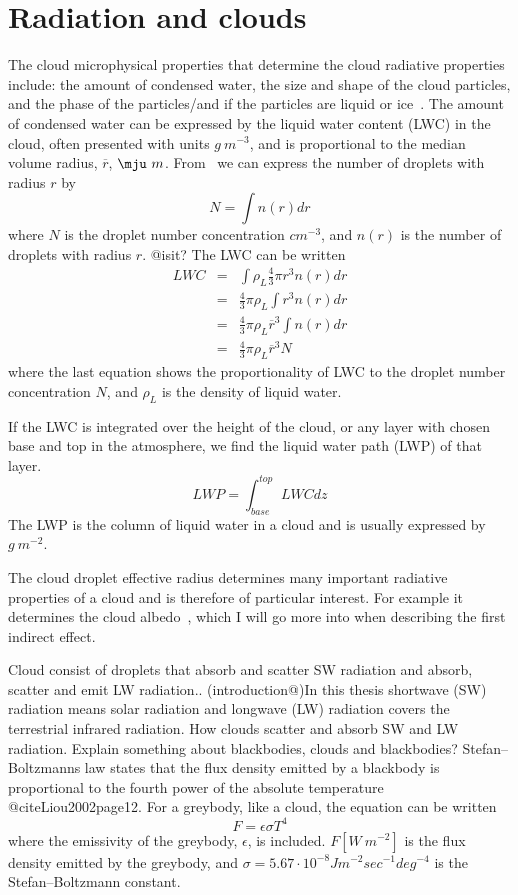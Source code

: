 \section{Radiation and clouds}
The cloud microphysical properties that determine the cloud radiative properties include: the amount of condensed water, the size and shape of the cloud particles, and the phase of the particles/and if the particles are liquid or ice~\citep{Curry1996}. The amount of condensed water can be expressed by the liquid water content (LWC) in the cloud, often presented with units $g~m^{-3}$, and is proportional to the median volume radius, $\overline{r}$, $\mju~m$. From~\cite{Rogers1989} we can express the number of droplets with radius $r$ by
\begin{equation}
N = \int n(r) dr
\end{equation}
where $N$ is the droplet number concentration $cm^{-3}$, and $n(r)$ is the number of droplets with radius $r$. @isit?
The LWC can be written
\begin{eqnarray}
LWC &=& \int \rho_L \frac{4}{3} \pi r^3 n(r) dr\\
&=& \frac{4}{3} \pi \rho_L \int r^3 n(r) dr\\
&=& \frac{4}{3} \pi \rho_L \overline{r}^3 \int n(r) dr\\
&=& \frac{4}{3} \pi \rho_L \overline{r}^3 N 
\end{eqnarray}
where the last equation shows the proportionality of LWC to the droplet number concentration $N$, and $\rho_L$ is the density of liquid water.

If the LWC is integrated over the height of the cloud, or any layer with chosen base and top in the atmosphere, we find the liquid water path (LWP) of that layer.
\begin{equation}
LWP = \int_{base}^{top} LWC dz
\end{equation}
The LWP is the column of liquid water in a cloud and is usually expressed by $g~m^{-2}$.


The cloud droplet effective radius determines many important radiative properties of a cloud and is therefore of particular interest. For example it determines the cloud albedo~\citep{Hansen1974}, which I will go more into when describing the first indirect effect.



Cloud consist of droplets that absorb and scatter SW radiation and absorb, scatter and emit LW radiation.. 
(introduction@)In this thesis shortwave (SW) radiation means solar radiation and longwave (LW) radiation covers the terrestrial infrared radiation.
How clouds scatter and absorb SW and LW radiation.
Explain something about blackbodies, clouds and blackbodies? Stefan–Boltzmanns law states that the flux density emitted by a blackbody is proportional to the fourth power of the absolute temperature @citeLiou2002page12. For a greybody, like a cloud, the equation can be written
\begin{equation}
F = \epsilon \sigma T^4
\end{equation}
where the emissivity of the greybody, $\epsilon$, is included. $F [W~m^{-2}]$ is the flux density emitted by the greybody, and $\sigma = 5.67\cdot 10^{-8} Jm^{-2}sec^{-1}deg^{-4}$ is the Stefan–Boltzmann constant.


